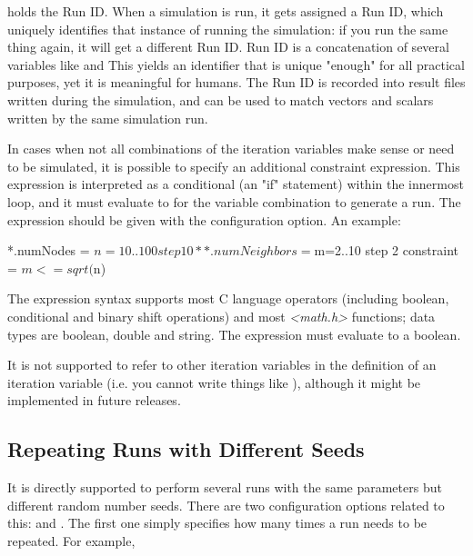  holds the Run ID. When a simulation is run, it gets assigned
a Run ID, which uniquely identifies that instance of running the
simulation: if you run the same thing again, it will get a different
Run ID. Run ID is a concatenation of several variables like
   and 
This yields an identifier that is unique
"enough" for all practical purposes, yet it
is meaningful for humans. The Run ID is recorded into result files
written during the simulation, and can be used to match vectors and
scalars written by the same simulation run.

In cases when not all combinations of the iteration variables make sense
or need to be simulated, it is possible to specify an additional
constraint expression. This expression is interpreted as a conditional
(an "if" statement) within the innermost
loop, and it must evaluate to  for
the variable combination to generate a run. The expression should be
given with the  configuration option. An example:

\begin{inifile}
*.numNodes = ${n=10..100 step 10}
**.numNeighbors = ${m=2..10 step 2}
constraint = $m <= sqrt($n)
\end{inifile}

The expression syntax supports most C language operators (including
boolean, conditional and binary shift operations) and most
\textit{<math.h>} functions; data types are boolean,
double and string. The expression must evaluate to a boolean.

\begin{note}
    It is not supported to refer to other iteration variables
    in the definition of an iteration variable (i.e. you cannot write
    things like ), although it might be implemented in
    future {\opp} releases.
\end{note}

\subsection{Repeating Runs with Different Seeds}

It is directly supported to perform several runs with the same
parameters but different random number seeds. There are two
configuration options related to this:  and .
The first one simply specifies how many times a run needs to be repeated. For
example,

